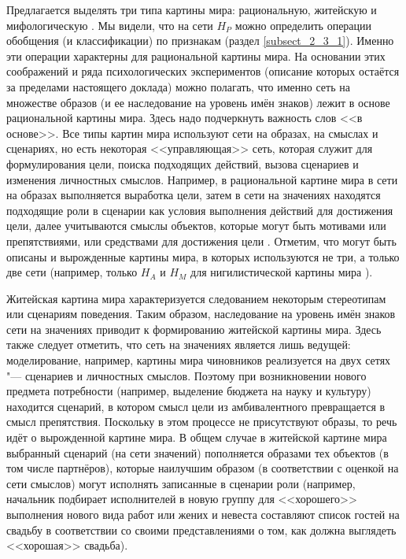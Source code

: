 \begin{appendices}
Предлагается выделять три типа картины мира: рациональную, житейскую и мифологическую \cite{Chudova2012a}. 
Мы видели, что на сети $H_P$ можно определить операции обобщения (и классификации) по признакам (раздел \ref{subsect_2_3_1}). Именно эти операции характерны для рациональной картины мира. На основании этих соображений и ряда психологических экспериментов (описание которых остаётся за пределами настоящего доклада) можно полагать, что именно сеть на множестве образов (и ее наследование на уровень имён знаков) лежит в основе рациональной картины мира. Здесь надо подчеркнуть важность слов <<в основе>>. Все типы картин мира используют сети на образах, на смыслах и сценариях, но есть некоторая <<управляющая>> сеть, которая служит для формулирования цели, поиска подходящих действий, вызова сценариев и изменения личностных смыслов. Например, в рациональной картине мира в сети на образах выполняется выработка цели, затем в сети на значениях находятся подходящие роли в сценарии как условия выполнения действий для достижения цели, далее учитываются смыслы объектов, которые могут быть мотивами или препятствиями, или средствами для достижения цели \cite{Chudova2014}. Отметим, что могут быть описаны и вырожденные картины мира, в которых используются не три, а только две сети (например, только $H_A$ и $H_M$ для нигилистической картины мира \cite{Chudova2012a}). 

Житейская картина мира характеризуется следованием некоторым стереотипам или сценариям поведения. Таким образом, наследование на уровень имён знаков сети на значениях приводит к формированию житейской картины мира. Здесь также следует отметить, что сеть на значениях является лишь ведущей: моделирование, например, картины мира чиновников реализуется на двух сетях "--- сценариев и личностных смыслов. Поэтому при возникновении нового предмета потребности (например, выделение бюджета на науку и культуру) находится сценарий, в котором смысл цели из амбивалентного превращается в смысл препятствия. Поскольку в этом процессе не присутствуют образы, то речь идёт о вырожденной картине мира. В общем случае в житейской картине мира выбранный сценарий (на сети значений) пополняется образами тех объектов (в том числе партнёров), которые наилучшим образом (в соответствии с оценкой на сети смыслов) могут исполнять записанные в сценарии роли (например, начальник подбирает исполнителей в новую группу для <<хорошего>> выполнения нового вида работ или жених и невеста составляют список гостей на свадьбу в соответствии со своими представлениями о том, как должна выглядеть <<хорошая>> свадьба).


\end{appendices}

